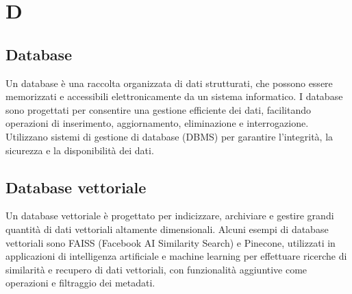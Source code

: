 \section{D}

\vspace{2em}
\subsection*{Database}
Un database è una raccolta organizzata di dati strutturati, che possono essere memorizzati e accessibili elettronicamente da un sistema informatico. I database sono progettati per consentire una gestione efficiente dei dati, facilitando operazioni di inserimento, aggiornamento, eliminazione e interrogazione. Utilizzano sistemi di gestione di database (DBMS) per garantire l'integrità, la sicurezza e la disponibilità dei dati.

\vspace{2em}
\subsection*{Database vettoriale}
Un database vettoriale è progettato per indicizzare, archiviare e gestire grandi quantità di dati vettoriali altamente dimensionali. Alcuni esempi di database vettoriali sono FAISS (Facebook AI Similarity Search) e Pinecone, utilizzati in applicazioni di intelligenza artificiale e machine learning per effettuare ricerche di similarità e recupero di dati vettoriali, con funzionalità aggiuntive come operazioni  e filtraggio dei metadati.


\vspace{2em}
